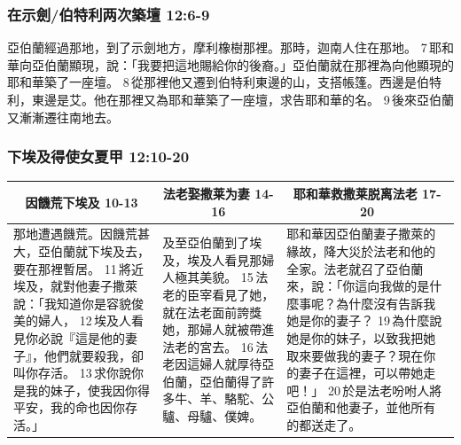 \subsubsection{在示劍/伯特利两次築壇 12:6-9}
亞伯蘭經過那地，到了示劍地方，摩利橡樹那裡。那時，迦南人住在那地。 7 耶和華向亞伯蘭顯現，說：「我要把這地賜給你的後裔。」亞伯蘭就在那裡為向他顯現的耶和華築了一座壇。
 8 從那裡他又遷到伯特利東邊的山，支搭帳篷。西邊是伯特利，東邊是艾。他在那裡又為耶和華築了一座壇，求告耶和華的名。 9 後來亞伯蘭又漸漸遷往南地去。



\subsubsection{下埃及得使女夏甲 12:10-20 }
\label{sec:XiaAiJiDeXiaJia}
\begin{table}[H]
\centering
\begin{tabular}{p{5.5cm}|p{4.250cm}|p{6.50cm}}\hline\hline
\multicolumn{1}{c|}{因饑荒下埃及 10-13}&\multicolumn{1}{c|}{法老娶撒莱为妻 14-16}&\multicolumn{1}{c}{耶和華救撒莱脱离法老 17-20}\\\hline

那地遭遇饑荒。因饑荒甚大，亞伯蘭就下埃及去，要在那裡暫居。 11 將近埃及，就對他妻子撒萊說：「我知道你是容貌俊美的婦人， 12 埃及人看見你必說『這是他的妻子』，他們就要殺我，卻叫你存活。 13 求你說你是我的妹子，使我因你得平安，我的命也因你存活。」 
&及至亞伯蘭到了埃及，埃及人看見那婦人極其美貌。 15 法老的臣宰看見了她，就在法老面前誇獎她，那婦人就被帶進法老的宮去。 16 法老因這婦人就厚待亞伯蘭，亞伯蘭得了許多牛、羊、駱駝、公驢、母驢、僕婢。 
&耶和華因亞伯蘭妻子撒萊的緣故，降大災於法老和他的全家。法老就召了亞伯蘭來，說：「你這向我做的是什麼事呢？為什麼沒有告訴我她是你的妻子？ 19 為什麼說她是你的妹子，以致我把她取來要做我的妻子？現在你的妻子在這裡，可以帶她走吧！」 20 於是法老吩咐人將亞伯蘭和他妻子，並他所有的都送走了。
\\\hline
\end{tabular}
\end{table}


